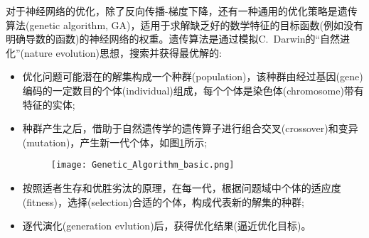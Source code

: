 对于神经网络的优化，除了反向传播-梯度下降，还有一种通用的优化策略是遗传算法\textrm{(genetic algorithm, GA)}，适用于求解缺乏好的数学特征的目标函数(例如没有明确导数的函数)的神经网络的权重。遗传算法是通过模拟\textrm{C.~Darwin}的“自然进化”(\textrm{nature evolution})思想，搜索并获得最优解的:~
	\begin{itemize}
		\item 优化问题可能潜在的解集构成一个种群(\textrm{population})，该种群由经过基因(\textrm{gene})编码的一定数目的个体(\textrm{individual})组成，每个个体是染色体(\textrm{chromosome})带有特征的实体;
		\item 种群产生之后，借助于自然遗传学的遗传算子进行组合交叉(\textrm{crossover})和变异(\textrm{mutation})，产生新一代个体，如图\ref{Optimize_GA}所示;
\begin{figure}[h!]
\vspace*{-0.10in}
\centering
\texttt{[image: Genetic\_Algorithm\_basic.png]}
\caption{\fontsize{7.2pt}{4.2pt}\selectfont{遗传算法中通过交叉和变异获得新一代个体的示意图.}}%
\label{Optimize_GA}
\end{figure}
		\item 按照适者生存和优胜劣汰的原理，在每一代，根据问题域中个体的适应度(\textrm{fitness})，选择(\textrm{selection})合适的个体，构成代表新的解集的种群;
		\item 逐代演化(\textrm{generation evlution})后，获得优化结果(逼近优化目标)。
	\end{itemize}

